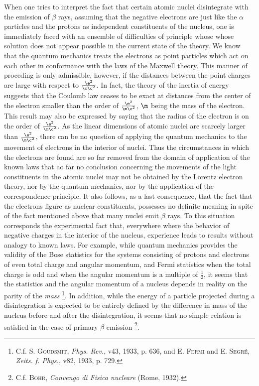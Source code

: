 \documentclass{article}
\newcommand{\valrzero}{\frac{\e^2}{\m\c^2}}
\begin{document}
When one tries to interpret the fact that certain atomic nuclei disintegrate with the emission of $\beta$ rays, assuming that the negative electrons are just like the $\alpha$ particles and the protons as independent constituents of the nucleus, one is immediately faced with an ensemble of difficulties of principle whose whose solution does not appear possible in the current state of the theory. We know that the quantum mechanics treats the electrons as point particles which act on each other in conformance with the laws of the Maxwell theory. This manner of proceding is only admissible, however, if the distances between the point charges are large with respect to $\valrzero$. In fact, the theory of the inertia of energy suggests that the Coulomb law ceases to be exact at distances from the center of the electron smaller than the order of $\valrzero$, $\m$ being the mass of the electron. This result may also be expressed by saying that the radius of the electron is on the order of $\valrzero$. As the linear dimensions of atomic nuclei are scarcely larger than $\valrzero$, there can be no question of applying the quantum mechanics to the movement of electrons in the interior of nuclei. Thus the circumstances in which the electrons are found are so far removed from the domain of application of the known laws that ao far no conclusion concerning the movements of the light constituents in the atomic nuclei may not be obtained by the Lorentz electron theory, nor by the quantum mechanics, nor by the application of the correspondence principle. It also follows, as a last consequence, that the fact that the electrons figure as nuclear constituents, possesses no definite meaning in spite of the fact mentioned above that many nuclei emit $\beta$ rays.
To this situation corresponds the experimental fact that, everywhere where the behavior of negative charges in the interior of the nucleus, experience leads to results without analogy to known laws. For example, while quantum mechanics provides the validity of the Bose statistics for the systems consisting of protons and electrons of even total charge and angular momentum, and Fermi statistics when the total charge is odd and when the angular momentum is a multiple of $\frac{1}{2}$, it seems that the statistics and the angular momentum of a nucleus depends in reality on the parity of the \textit{mass} \footnote{C.f. \textsc{S. Goudsmit}, \textit{Phys. Rev.}, v43, 1933, p. 636, and \textsc{E. Fermi} and \textsc{E. Segré}, \textit{Zeits. f. Phys.}, v82, 1933, p. 729.}.
In addition, while the energy of a particle projected during a disintegration is expected to be entirely defined by the difference in mass of the nucleus before and after the disintegration, it seems that no simple relation is satisfied in the case of primary $\beta$ emission \footnote{C.f. \textsc{Bohr}, \textit{Convengo di Fisica nucleare} (Rome, 1932).}.
\end{document}
